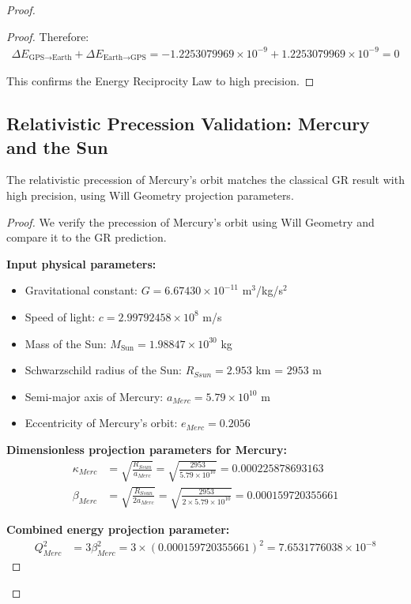 \documentclass{article}
\begin{document}
\begin{theorem}
\begin{proof}
\begin{proof}
Therefore:
\begin{align}
\Delta E_{\text{GPS} \rightarrow \text{Earth}}+\Delta E_{\text{Earth} \rightarrow \text{GPS}}  = -1.2253079969\times10^{-9} + 1.2253079969\times10^{-9} = 0
\end{align}

This confirms the Energy Reciprocity Law to high precision.
\end{proof}

\subsection{Relativistic Precession Validation: Mercury and the Sun}

\begin{theorem}
The relativistic precession of Mercury's orbit matches the classical GR result with high precision, using Will Geometry projection parameters.
\end{theorem}

\begin{proof}
We verify the precession of Mercury's orbit using Will Geometry and compare it to the GR prediction.

\textbf{Input physical parameters:}
\begin{itemize}
\item Gravitational constant: $G = 6.67430 \times 10^{-11}$ m$^3$/kg/s$^2$
\item Speed of light: $c = 2.99792458 \times 10^8$ m/s
\item Mass of the Sun: $M_{\text{Sun}} = 1.98847 \times 10^{30}$ kg
\item Schwarzschild radius of the Sun: $R_{Ssun} = 2.953$ km = $2953$ m
\item Semi-major axis of Mercury: $a_{Merc} = 5.79 \times 10^{10}$ m
\item Eccentricity of Mercury's orbit: $e_{Merc} = 0.2056$
\end{itemize}

\textbf{Dimensionless projection parameters for Mercury:}
\begin{align}
\kappa_{Merc} &= \sqrt{\frac{R_{Ssun}}{a_{Merc}}} = \sqrt{\frac{2953}{5.79 \times 10^{10}}} = 0.000225878693163 \\
\beta_{Merc} &= \sqrt{\frac{R_{Ssun}}{2 a_{Merc}}} = \sqrt{\frac{2953}{2 \times 5.79 \times 10^{10}}} = 0.000159720355661
\end{align}

\textbf{Combined energy projection parameter:}
\begin{align}
Q_{Merc}^{2} &= 3 \beta_{Merc}^{2} = 3 \times (0.000159720355661)^2 = 7.6531776038 \times 10^{-8}
\end{align}


\end{proof}
\end{proof}
\end{theorem}
\end{document}
